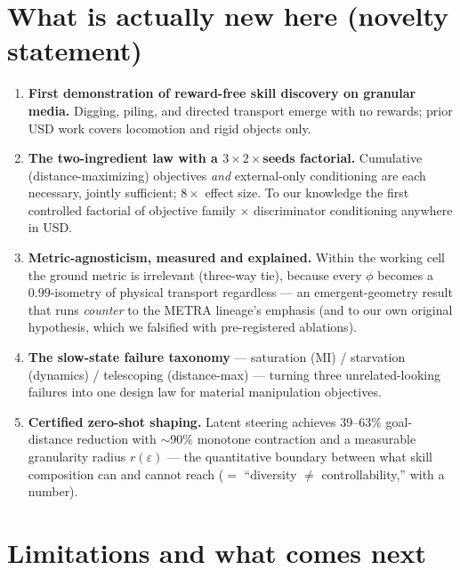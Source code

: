 \documentclass[11pt,a4paper]{article}
\begin{document}
\section{What is actually new here (novelty statement)}

\begin{enumerate}[leftmargin=6mm]
\item \textbf{First demonstration of reward-free skill discovery on granular
media.} Digging, piling, and directed transport emerge with no rewards; prior
USD work covers locomotion and rigid objects only.
\item \textbf{The two-ingredient law with a $3\times2\times$seeds factorial.}
Cumulative (distance-maximizing) objectives \emph{and} external-only
conditioning are each necessary, jointly sufficient; $8\times$ effect size.
To our knowledge the first controlled factorial of objective family $\times$
discriminator conditioning anywhere in USD.
\item \textbf{Metric-agnosticism, measured and explained.} Within the working
cell the ground metric is irrelevant (three-way tie), because every $\phi$
becomes a $0.99$-isometry of physical transport regardless --- an emergent-geometry
result that runs \emph{counter} to the METRA lineage's emphasis (and to our own
original hypothesis, which we falsified with pre-registered ablations).
\item \textbf{The slow-state failure taxonomy} --- saturation (MI) / starvation
(dynamics) / telescoping (distance-max) --- turning three unrelated-looking
failures into one design law for material manipulation objectives.
\item \textbf{Certified zero-shot shaping.} Latent steering achieves 39--63\%
goal-distance reduction with $\sim$90\% monotone contraction and a measurable
granularity radius $r(\varepsilon)$ --- the quantitative boundary between what
skill composition can and cannot reach ($=$ ``diversity $\neq$ controllability,''
with a number).
\end{enumerate}

\section{Limitations and what comes next}
\end{document}
